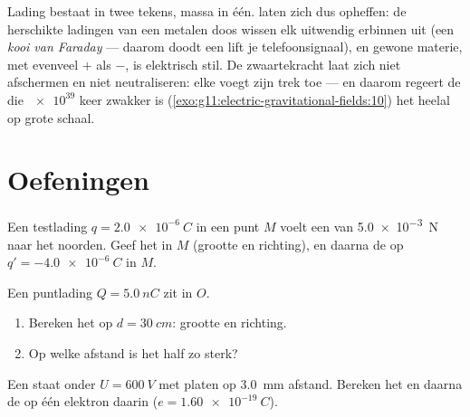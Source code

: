 \begin{remark}\label{rem:g11:electric-gravitational-fields:noanalogue}
Lading bestaat in twee tekens, massa in één.  laten
zich dus opheffen: de herschikte ladingen van een metalen doos wissen
elk uitwendig  erbinnen uit (een \emph{kooi van Faraday} --- daarom
doodt een lift je telefoonsignaal), en gewone materie, met evenveel $+$
als $-$, is elektrisch stil. De zwaartekracht laat zich niet afschermen
en niet neutraliseren: elke  voegt zijn trek toe --- en daarom
regeert de  die $\num{e39}$ keer zwakker is
(\cref{exo:g11:electric-gravitational-fields:10}) het heelal op grote
schaal.
\end{remark}

\section{Oefeningen}

\begin{exercise}[$\star$]\label{exo:g11:electric-gravitational-fields:1}
Een testlading $q = \qty{+2.0e-6}{C}$ in een punt $M$ voelt een 
van \qty{5.0e-3}{N} naar het noorden. Geef het  in $M$ (grootte en
richting), en daarna de  op $q' = \qty{-4.0e-6}{C}$ in $M$.
\end{exercise}

\begin{exercise}[$\star$]\label{exo:g11:electric-gravitational-fields:2}
Een puntlading $Q = \qty{+5.0}{nC}$ zit in $O$.
\begin{enumerate}
  \item Bereken het  op $d = \qty{30}{cm}$: grootte en richting.
  \item Op welke afstand is het  half zo sterk?
\end{enumerate}
\end{exercise}

\begin{exercise}[$\star$]\label{exo:g11:electric-gravitational-fields:3}
Een  staat onder $U = \qty{600}{V}$ met platen op
\qty{3.0}{mm} afstand. Bereken het  en daarna de  op één
elektron daarin ($e = \qty{1.60e-19}{C}$).
\end{exercise}

